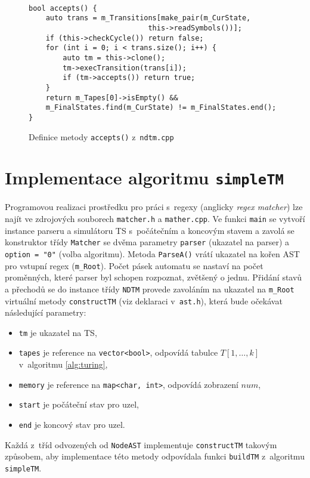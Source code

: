 \documentclass[thesis=B,czech]{FITthesis}[2019/12/23]
\theoremstyle{definition}
\begin{document}
\begin{figure}[ht]
	\begin{verbatim}

bool accepts() {
    auto trans = m_Transitions[make_pair(m_CurState, 
							this->readSymbols())];
    if (this->checkCycle()) return false;
    for (int i = 0; i < trans.size(); i++) {
        auto tm = this->clone();
        tm->execTransition(trans[i]);
        if (tm->accepts()) return true;
    }
    return m_Tapes[0]->isEmpty() && 
	m_FinalStates.find(m_CurState) != m_FinalStates.end();
}
	\end{verbatim}
	\caption{Definice metody \texttt{accepts()} z~\texttt{ndtm.cpp}}\label{code:accepts}
\end{figure}


\section{Implementace algoritmu \texttt{simpleTM}}\label{sec:implTM}
Programovou realizaci prostředku pro práci s~regexy (anglicky \emph{regex matcher}) lze najít ve zdrojových souborech \texttt{matcher.h} a \texttt{mather.cpp}. Ve funkci \texttt{main} se vytvoří instance parseru a simulátoru TS s~počátečním a koncovým stavem a zavolá se konstruktor třídy \texttt{Matcher} se dvěma parametry \texttt{parser} (ukazatel na parser) a \texttt{option = "0"} (volba algoritmu). Metoda \texttt{ParseA()} vrátí ukazatel na kořen AST pro vstupní regex (\texttt{m\_Root}). Počet pásek automatu se nastaví na počet proměnných, které parser byl schopen rozpoznat, zvětšený o jednu. Přidání stavů a přechodů se do instance třídy \texttt{NDTM} provede zavoláním na ukazatel na \texttt{m\_Root} virtuální metody \texttt{constructTM} (viz deklaraci v~\texttt{ast.h}), která bude očekávat následující parametry:
\begin{itemize}
	\item{\texttt{tm} je ukazatel na TS,}
	\item{\texttt{tapes} je reference na \texttt{vector<bool>}, odpovídá tabulce $T[1,\dots,k]$ v~algoritmu \ref{alg:turing}, }
	\item{\texttt{memory} je reference na \texttt{map<char, int>}, odpovídá zobrazení $num$,}
	\item{\texttt{start} je počáteční stav pro uzel,}
	\item{\texttt{end} je koncový stav pro uzel.}
\end{itemize}
Každá z~tříd odvozených od \texttt{NodeAST} implementuje \texttt{constructTM} takovým způsobem, aby implementace této metody odpovídala funkci \texttt{buildTM} z~algoritmu \texttt{simpleTM}. 
\end{document}

